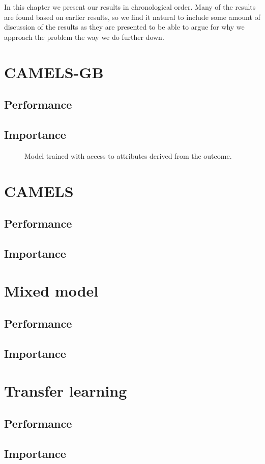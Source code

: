 In this chapter we present our results in chronological order. Many of the results 
are found based on earlier results, so we find it natural to include some amount 
of discussion of the results as they are presented to be able to argue for why we 
approach the problem the way we do further down.
\section{CAMELS-GB}
\subsection{Performance}
\subsection{Importance}
\begin{figure}
\caption{Model trained with access to attributes derived from the outcome.}
\end{figure}
\section{CAMELS}
\subsection{Performance}
\subsection{Importance}
\section{Mixed model}
\subsection{Performance}
\subsection{Importance}
\section{Transfer learning}
\subsection{Performance}
\subsection{Importance}
